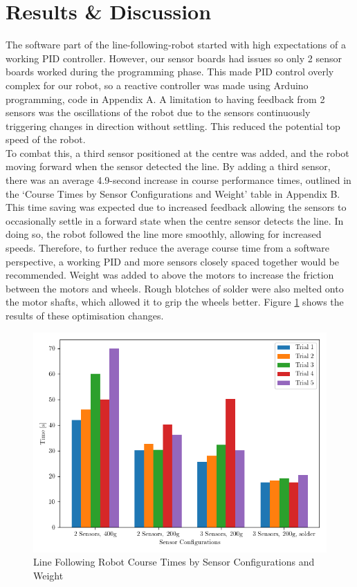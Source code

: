 \documentclass{article}
\begin{document}
\section{Results \& Discussion}
The software part of the line-following-robot started with high expectations of a working PID controller. However, our sensor boards had issues so only 2 sensor boards worked during the programming phase. This made PID control overly complex for our robot, so a reactive controller was made using Arduino programming, code in Appendix A. A limitation to having feedback from 2 sensors was the oscillations of the robot due to the sensors continuously triggering changes in direction without settling. This reduced the potential top speed of the robot. 
\\

To combat this, a third sensor positioned at the centre was added, and the robot moving forward when the sensor detected the line. By adding a third sensor, there was an average 4.9-second increase in course performance times, outlined in the ‘Course Times by Sensor Configurations and Weight’ table in Appendix B. This time saving was expected due to increased feedback allowing the sensors to occasionally settle in a forward state when the centre sensor detects the line. In doing so, the robot followed the line more smoothly, allowing for increased speeds. Therefore, to further reduce the average course time from a software perspective, a working PID and more sensors closely spaced together would be recommended. Weight was added to above the motors to increase the friction between the motors and wheels. Rough blotches of solder were also melted onto the motor shafts, which allowed it to grip the wheels better. Figure \ref{fig:Trialchart} shows the results of these optimisation changes. 

\begin{figure}[H]
    \centering
    \includegraphics[width=0.5\linewidth]{REPORT/plotv3.png}
    \caption{Line Following Robot Course Times by Sensor Configurations and Weight }
    \label{fig:Trialchart}
\end{figure}
\end{document}

